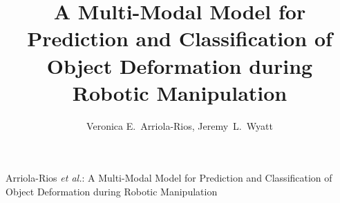 \documentclass[journal]{IEEEtran}
\begin{document}
%
\title{A Multi-Modal Model for Prediction and Classification of Object Deformation during Robotic Manipulation}
%
%
%

\author{Veronica E.~Arriola-Rios,
        Jeremy~L.~Wyatt}

% 
%



%
{Arriola-Rios \MakeLowercase{\textit{et al.}}: A Multi-Modal Model for Prediction and Classification of Object Deformation during Robotic Manipulation}
% 
\end{document}
